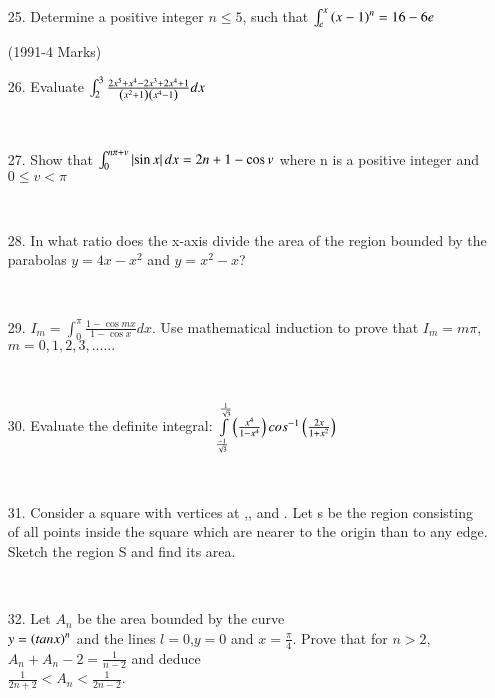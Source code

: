 \documentclass[journal,12pt,twocolumn]{IEEEtran}
\theoremstyle{remark}
\begin{document}
\begin{enumerate}
\hfill{}

\item[25.]  Determine a positive integer $n\leq 5$, such that $\int_e^x\left(x-1\right)^n=16-6e$

\hfill{(1991-4 Marks)}\\

\item[26.]  Evaluate $\int_{2}^{3}\frac{2x^5+x^4-2x^3+2x^4+1}{\left(x^2+1\right)\left(x^4-1\right)}dx$

\hfill{}\\

\item[27.]  Show that $\int_{0}^{n\pi+v}\left\vert\sin x\right\vert dx=2n+1-\cos v$ where n is a positive integer and $0 \leq v < \pi$

\hfill{}\\

\item[28.]  In what ratio does the x-axis divide the area of the region bounded by the parabolas $y=4x-x^2$ and $y=x^2-x$?

\hfill{}\\

\item[29.]  $I_m=\int_{0}^{\pi}\frac{1-\cos mx}{1-\cos x}dx$. Use mathematical induction to prove that $I_m=m\pi$, $m=0,1,2,3,......$

\hfill{}\\

\item[30.]  Evaluate the definite integral:
$\int\limits_{\frac{-1}{\sqrt{3}}}^{\frac{1}{\sqrt{3}}}\left(\frac{x^4}{1-x^4}\right)
cos^{-1}\left(\frac{2x}{1+x^2}\right)$

\hfill{}\\

\item[31.]  Consider a square with vertices at ,, and . Let s be the region consisting of all points inside  the square which are nearer to the origin than to any edge. Sketch the region S and find its area.

\hfill{}\\

\item[32.]  Let $A_n$ be the area bounded by the curve\\ $y=\left(tanx\right)^n$ and the lines $l=0$,$y=0$ and $x=\frac{\pi}{4}$. Prove that for $n>2$, $A_n+A_n-2=\frac{1}{n-2}$ and deduce\\ $\frac{1}{2n+2}<A_n<\frac{1}{2n-2}$.



\end{enumerate}
\end{document}
